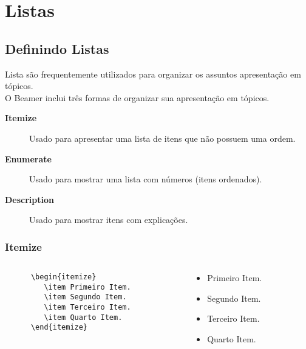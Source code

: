 \section{Listas}
\subsection{Definindo Listas}

\begin{frame}

  Lista são frequentemente utilizados para organizar os assuntos apresentação em tópicos. \\

  O Beamer inclui três formas de organizar sua apresentação em tópicos. \\

  \begin{description}
     \item[\textbf{Itemize}] Usado para apresentar uma lista de itens que não possuem uma ordem.
     \item[\textbf{Enumerate}] Usado para mostrar uma lista com números (itens ordenados).
     \item[\textbf{Description}] Usado para mostrar itens com explicações.
  \end{description}

\end{frame}


\begin{frame}[fragile]
  \frametitle{Itemize}

  \begin{columns}
    \begin{column}[l]{5cm}
     \begin{verbatim}
      \begin{itemize}
         \item Primeiro Item.
         \item Segundo Item.
         \item Terceiro Item.
         \item Quarto Item.
      \end{itemize}
  \end{verbatim}

    \end{column}

    \begin{column}[r]{5cm}
      \begin{itemize}
         \item Primeiro Item.
         \item Segundo Item.
         \item Terceiro Item.
         \item Quarto Item.
      \end{itemize}
    \end{column}
  \end{columns}
\end{frame}

